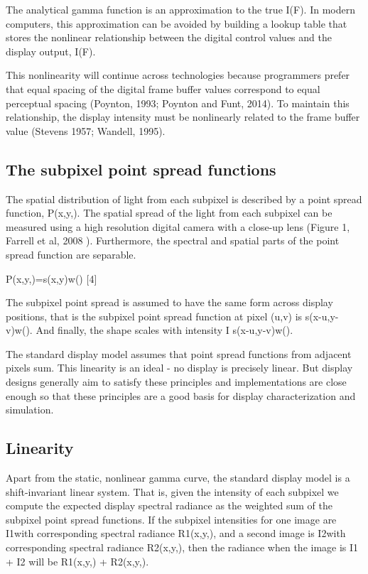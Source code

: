 \documentclass[
  letterpaper,
]{book}
\begin{document}
The analytical gamma function is an approximation to the true I(F). In
modern computers, this approximation can be avoided by building a lookup
table that stores the nonlinear relationship between the digital control
values and the display output, I(F).

This nonlinearity will continue across technologies because programmers
prefer that equal spacing of the digital frame buffer values correspond
to equal perceptual spacing (Poynton, 1993; Poynton and Funt, 2014). To
maintain this relationship, the display intensity must be nonlinearly
related to the frame buffer value (Stevens 1957; Wandell, 1995).

\subsection{\texorpdfstring{\textbf{The subpixel point spread
functions}}{The subpixel point spread functions}}\label{the-subpixel-point-spread-functions}

The spatial distribution of light from each subpixel is described by a
point spread function, P(x,y,). The spatial spread of the light from
each subpixel can be measured using a high resolution digital camera
with a close-up lens (Figure 1, Farrell et al, 2008 ). Furthermore, the
spectral and spatial parts of the point spread function are separable.

P(x,y,)=s(x,y)w() {[}4{]}

The subpixel point spread is assumed to have the same form across
display positions, that is the subpixel point spread function at pixel
(u,v) is s(x-u,y-v)w(). And finally, the shape scales with intensity I
s(x-u,y-v)w().

The standard display model assumes that point spread functions from
adjacent pixels sum. This linearity is an ideal - no display is
precisely linear. But display designs generally aim to satisfy these
principles and implementations are close enough so that these principles
are a good basis for display characterization and simulation.

\subsection{\texorpdfstring{\textbf{Linearity}}{Linearity}}\label{linearity-1}

Apart from the static, nonlinear gamma curve, the standard display model
is a shift-invariant linear system. That is, given the intensity of each
subpixel we compute the expected display spectral radiance as the
weighted sum of the subpixel point spread functions. If the subpixel
intensities for one image are I1with corresponding spectral radiance
R1(x,y,), and a second image is I2with corresponding spectral radiance
R2(x,y,), then the radiance when the image is I1 + I2 will be R1(x,y,) +
R2(x,y,).
\end{document}
